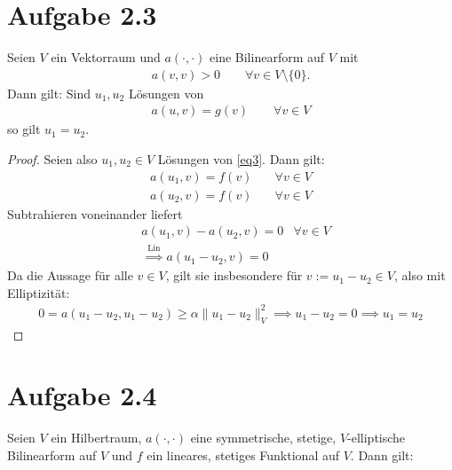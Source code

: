 \documentclass[12pt,a4paper]{article}
\begin{document}
\section*{Aufgabe 2.3}
Seien $V$ ein Vektorraum und $a(\cdot,\cdot)$ eine Bilinearform auf $V$ mit
\begin{align*}
a(v,v)>0\qquad\forall v\in V\setminus\lbrace0\rbrace.
\end{align*}
Dann gilt: Sind $u_1,u_2$ Lösungen von
\begin{align}\label{eq3}
a(u,v)=g(v)\qquad\forall v\in V
\end{align}
so gilt $u_1=u_2$.

\begin{proof}
Seien also $u_1,u_2\in V$ Lösungen von \eqref{eq3}. Dann gilt:
\begin{align*}
a(u_1,v)=f(v) \quad&\forall v\in V\\
a(u_2,v)=f(v) \quad&\forall v\in V
\end{align*}
Subtrahieren voneinander liefert
\begin{align*}
&a(u_1,v)-a(u_2,v)=0 &\forall v\in V\\
&\stackrel{\text{Lin}}{\implies}
a(u_1-u_2,v)=0
\end{align*}
Da die Aussage für alle $v\in V$, gilt sie insbesondere für $v:=u_1-u_2\in V$, also mit Elliptizität:
\begin{align*}
0=a(u_1-u_2,u_1-u_2)\geq \alpha \|u_1-u_2\|^2_V\implies u_1-u_2=0\implies u_1=u_2
\end{align*}
\end{proof}


\section*{Aufgabe 2.4}
Seien $V$ ein Hilbertraum, $a(\cdot,\cdot)$ eine symmetrische, stetige, $V$-elliptische Bilinearform auf $V$ und $f$ ein lineares, stetiges Funktional auf $V$. Dann gilt:
\end{document}

